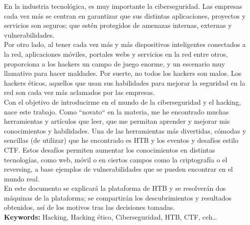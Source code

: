 En la industria tecnológica,  es muy importante la ciberseguridad. Las empresas cada vez más se centran en garantizar que sus distintas aplicaciones, proyectos y servicios son seguros; que estén protegidos de amenazas internas, externas y vulnerabilidades.\\

Por otro lado, al tener cada vez más y más dispositivos inteligentes conectados a la red, aplicaciones móviles, portales webs y servicios en la red entre otros, proporciona a los hackers un campo de juego enorme, y un escenario muy llamativo para hacer maldades. Por suerte, no todos los hackers son malos. Los hackers éticos, aquellos que usan sus habilidades para mejorar la seguridad en la red son cada vez más aclamados por las empresas.\\

Con el objetivo de introducirme en el mundo de la ciberseguridad y el hacking, nace este trabajo. Como ``novato`` en la materia, me he encontrado muchas herramientas y artículos que leer, que me permitan aprender y mejorar mis conocimientos y habilidades. Una de las herramientas más divertidas, cómodas y sencillas (de utilizar) que he encontrado es \acrlong{HTB} y los eventos y desafíos estilo \acrlong{CTF}. Estos desafíos permiten aumentar los conocimientos en distintas tecnologías, como web, móvil o en ciertos campos como la criptografía o el reversing, a base ejemplos de vulnerabilidades que se pueden encontrar en el mundo real. \\

En este documento se explicará la plataforma de \acrlong{HTB} y se resolverán dos máquinas de la plataforma; se compartirán los descubrimientos y resultados obtenidos, así de los motivos tras las decisiones tomadas.\\

\textbf{Keywords:} Hacking, Hacking ético, Ciberseguridad, \acrlong{HTB}, \acrlong{CTF}, \acrlong{ceh}\ldots
